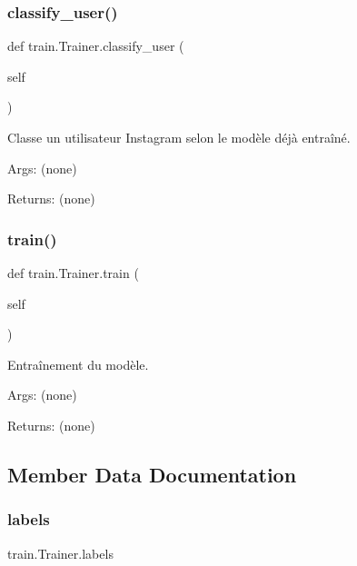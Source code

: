 \subsubsection{\texorpdfstring{classify\+\_\+user()}{classify\_user()}}
{\footnotesize\ttfamily def train.\+Trainer.\+classify\+\_\+user (\begin{DoxyParamCaption}\item[{}]{self }\end{DoxyParamCaption})}

\begin{DoxyVerb}Classe un utilisateur Instagram selon le modèle déjà entraîné.

Args:
    (none)

Returns:
    (none)
\end{DoxyVerb}
 \mbox{\label{classtrain_1_1_trainer_a9af45043f80d721cc77e5feaa80d589b}} 
\subsubsection{\texorpdfstring{train()}{train()}}
{\footnotesize\ttfamily def train.\+Trainer.\+train (\begin{DoxyParamCaption}\item[{}]{self }\end{DoxyParamCaption})}

\begin{DoxyVerb}Entraînement du modèle.

    Args:
(none)
    
    Returns:
(none)
\end{DoxyVerb}
 

\subsection{Member Data Documentation}
\mbox{\label{classtrain_1_1_trainer_ad50e395082044b5360a36a05228214e3}} 
\subsubsection{\texorpdfstring{labels}{labels}}
{\footnotesize\ttfamily train.\+Trainer.\+labels}



